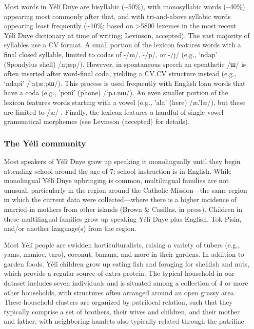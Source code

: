 \documentclass[english,,man,floatsintext]{apa6}
\begin{document}
Most words in Yélî Dnye are bisyllabic (\textasciitilde{}50\%), with
monosyllabic words (\textasciitilde{}40\%) appearing most commonly after
that, and with tri-and-above syllabic words appearing least frequently
(\textasciitilde{}10\%; based on \textgreater{}5800 lexemes in the most
recent Yélî Dnye dictionary at time of writing; Levinson, accepted). The
vast majority of syllables use a CV format. A small portion of the
lexicon features words with a final closed syllable, limited to codas of
-/m/, -/p/, or -/j/ (e.g., `ndap' (Spondylus shell) /ṇṭæp/). However, in
spontaneous speech an epenthetic /ɯ/ is often inserted after word-final
coda, yielding a CV.CV structure instead (e.g., `ndapî' /`ṇṭæ.pɯ/). This
process is used frequently with English loan words that have a coda
(e.g., 'ponî' (phone) /`pɔ.nɯ/). An even smaller portion of the lexicon
features words starting with a vowel (e.g., 'ala' (here) /æ.'læ/), but
these are limited to /æ/-. Finally, the lexicon features a handful of
single-vowel grammatical morphemes (see Levinson (accepted) for
details).

\subsubsection{The Yélî community}\label{the-yuxe9luxee-community}

Most speakers of Yélî Dnye grow up speaking it monolingually until they
begin attending school around the age of 7; school instruction is in
English. While monolingual Yélî Dnye upbringing is common, multilingual
families are not unusual, particularly in the region around the Catholic
Mission---the same region in which the current data were
collected---where there is a higher incidence of married-in mothers from
other islands (Brown \& Casillas, in press). Children in these
multilingual families grow up speaking Yélî Dnye plus English, Tok
Pisin, and/or another language(s) from the region.

Most Yélî people are swidden horticulturalists, raising a variety of
tubers (e.g., yams, manioc, taro), coconut, banana, and more in their
gardens. In addition to garden foods, Yélî children grow up eating fish
and foraging for shellfish and nuts, which provide a regular source of
extra protein. The typical household in our dataset includes seven
individuals and is situated among a collection of 4 or more other
households, with structures often arranged around an open grassy area.
These household clusters are organized by patrilocal relation, such that
they typically comprise a set of brothers, their wives and children, and
their mother and father, with neighboring hamlets also typically related
through the patriline.
\end{document}
